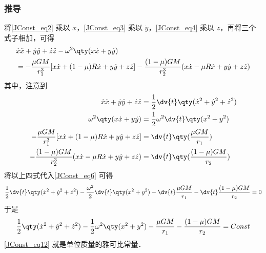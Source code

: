 \subsubsection{推导}
将\autoref{JConst_eq2} 乘以 $\dot{x}$，\autoref{JConst_eq3} 乘以 $\dot{y}$，\autoref{JConst_eq4} 乘以 $\dot{z}$，再将三个式子相加，可得
\begin{equation}\label{JConst_eq6} %
\begin{aligned}
&\dot{x} \ddot{x}+\dot{y}\ddot{y}+\dot{z}\ddot{z}-\omega^2\qty(x\dot{x}+y\dot{y})\\
&=-\frac{\mu GM}{r_1^3}[x\dot{x}+(1-\mu)R\dot{x}+y\dot{y}+z\dot{z}]-\frac{(1-\mu)GM}{r_2^3}(x\dot{x}-\mu R\dot{x}+y\dot{y}+z\dot{z})
\end{aligned}
\end{equation}
其中，注意到
\begin{align}
\dot{x}\ddot{x}+\dot{y}\ddot{y}+\dot{z}\ddot{z} &=\frac{1}{2}\dv{t}\qty(\dot{x}^2+\dot{y}^2+\dot{z}^2)\\%
\omega^2\qty(x\dot{x}+y\dot{y}) &=\frac{1}{2}\omega^2\dv{t}\qty(x^2+y^2)\\%
-\frac{\mu GM}{r_1^3}[x\dot{x}+(1-\mu)R\dot{x}+y\dot{y}+z\dot{z}] &=\dv{t}\qty(\frac{\mu GM}{r_1})\\%
-\frac{(1-\mu)GM}{r_2^3}(x\dot{x}-\mu R\dot{x}+y\dot{y}+z\dot{z}) &=\dv{t}\qty(\frac{(1-\mu) GM}{r_2})%
\end{align}
将以上四式代入\autoref{JConst_eq6} 可得
\begin{equation}%
\frac{1}{2}\dv{t}\qty(\dot{x}^2+\dot{y}^2+\dot{z}^2)-\frac{\omega^2}{2}\dv{t}\qty(x^2+y^2)-\dv{t}\frac{\mu GM}{r_1}-\dv{t}\frac{(1-\mu) GM}{r_2}=0
\end{equation}
于是
\begin{equation}\label{JConst_eq12} %
\frac{1}{2}\qty(\dot{x}^2+\dot{y}^2+\dot{z}^2)-\frac{1}{2}\omega^2\qty(x^2+y^2)-\frac{\mu GM}{r_1}-\frac{(1-\mu) GM}{r_2}=Const
\end{equation}
\autoref{JConst_eq12} 就是单位质量的雅可比常量．
